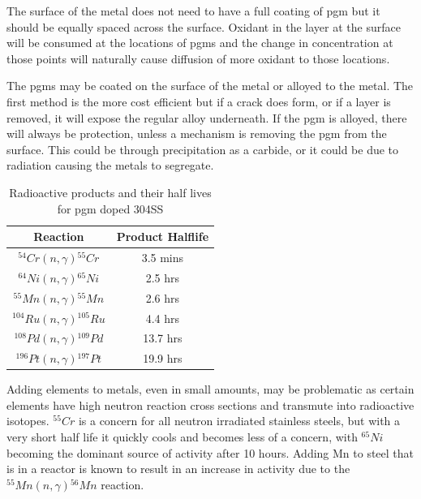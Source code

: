 The surface of the metal does not need to have a full coating of \acrshort{pgm} but it should be equally spaced across the surface.  Oxidant in the layer at the surface will be consumed at the locations of \acrshort{pgm}s and the change in concentration at those points will naturally cause diffusion of more oxidant to those locations\cite{noblemetalchemical}.

The \acrshort{pgm}s may be coated on the surface of the metal or alloyed to the metal.  The first method is the more cost efficient but if a crack does form, or if a layer is removed, it will expose the regular alloy underneath.  If the \acrshort{pgm} is alloyed, there will always be protection, unless a mechanism is removing the \acrshort{pgm} from the surface.  This could be through precipitation as a carbide, or it could be due to radiation causing the metals to segregate.

\begin{table}[h]
\begin{center}
\renewcommand{\arraystretch}{1.2}
\begin{tabular}{c c}
\hline\hline
Reaction & Product Halflife\\
\hline\hline
${}^{54}Cr(n, \gamma){}^{55}Cr$ & 3.5 mins \\ 
${}^{64}Ni(n, \gamma){}^{65}Ni$ & 2.5 hrs  \\
${}^{55}Mn(n, \gamma){}^{55}Mn$ & 2.6 hrs  \\
${}^{104}Ru(n, \gamma){}^{105}Ru$ & 4.4 hrs  \\
${}^{108}Pd(n, \gamma){}^{109}Pd$ & 13.7 hrs  \\
${}^{196}Pt(n, \gamma){}^{197}Pt$ & 19.9 hrs  \\
\hline\hline
\end{tabular}
\end{center}
\caption{Radioactive products and their half lives for \acrshort{pgm} doped 304SS}
\label{table:304ssradioactive}
\end{table}

Adding elements to metals, even in small amounts, may be problematic as certain elements have high neutron reaction cross sections and transmute into radioactive isotopes.  ${}^{55}Cr$ is a concern for all neutron irradiated stainless steels, but with a very short half life it quickly cools and becomes less of a concern, with ${}^{65}Ni$ becoming the dominant source of activity after 10 hours.  Adding Mn to steel that is in a reactor is known to result in an increase in activity due to the ${}^{55}Mn(n, \gamma){}^{56}Mn$ reaction.  

